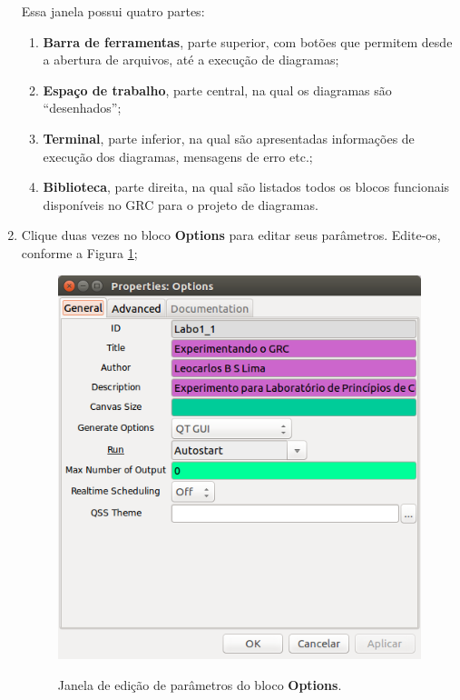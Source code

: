 \documentclass[12pt,addpoints]{exam}
\newcommand{\myscale}{0.4}
\begin{document}
\begin{enumerate}
    Essa janela possui quatro partes:
    \begin{enumerate}
        \item \textbf{Barra de ferramentas}, parte superior, com botões que permitem desde a abertura de arquivos, até a execução de diagramas;
        \item \textbf{Espaço de trabalho}, parte central, na qual os diagramas são ``desenhados'';
        \item \textbf{Terminal}, parte inferior, na qual são apresentadas informações de execução dos diagramas, mensagens de erro etc.;
        \item \textbf{Biblioteca}, parte direita, na qual são listados todos os blocos funcionais disponíveis no GRC para o projeto de diagramas.
    \end{enumerate}
    \item Clique duas vezes no bloco \textbf{Options} para editar seus parâmetros. Edite-os, conforme a Figura \ref{fig:GRC_1-1b};
    \begin{figure}[htb]
        \centering
        \includegraphics[scale=\myscale]{./Figuras/GRC_1-1b} \\
        \caption{Janela de edição de parâmetros do bloco \textbf{Options}.} 
        \label{fig:GRC_1-1b}
    \end{figure}

\end{enumerate}
\end{document}
